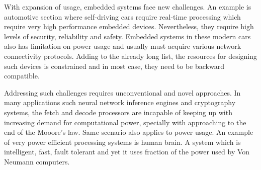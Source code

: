 \documentclass[12pt,oneside]{book}
\begin{document}
With expansion of usage, embedded systems face new challenges. An example is automotive section where self-driving cars require real-time processing which require very high performance embedded devices. Nevertheless, they require high levels of security, reliability and safety. Embedded systems in these modern cars also has limitation on power usage and usually must acquire various network connectivity protocols. Adding to the already long list, the resources for designing such devices is constrained and in most case, they need to be backward compatible. 


Addressing such challenges requires unconventional and novel approaches. In many applications such neural network inference engines and cryptography systems, the fetch and decode processors are incapable of keeping up with increasing demand for computational power, specially with approaching to the end of the Mooore's law. Same scenario also applies to power usage. An example of very power efficient  processing systems is human brain. A system which is intelligent, fast, fault tolerant and yet it uses fraction of the power used by Von Neumann computers. 
\end{document}
